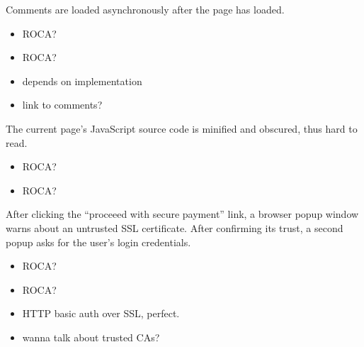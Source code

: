 \documentclass{beamer}
\newcommand{\rocaok}{\ding{51}}
\begin{document}
\begin{frame}
  Comments are loaded asynchronously after the page has loaded.

  \vspace{0.3cm}
  \begin{itemize}
    \item<1|only@1>[\Large $\square$] \Large ROCA?
    \item<2|only@2>[\Large \rocaok] \Large ROCA?
    \item<2> depends on implementation
    \item<2> link to comments?
  \end{itemize}

\end{frame}

\begin{frame}
  The current page's JavaScript source code is minified and obscured, thus hard
  to read.

  \vspace{0.3cm}
  \begin{itemize}
    \item<1|only@1>[\Large $\square$] \Large ROCA?
    \item<2|only@2>[\Large \rocaok] \Large ROCA?
  \end{itemize}

\end{frame}

\begin{frame}
  After clicking the ``proceeed with secure payment'' link, a browser popup window
  warns about an untrusted SSL certificate. After confirming its trust, a second
  popup asks for the user's login credentials.

  \vspace{0.3cm}
  \begin{itemize}
    \item<1|only@1>[\Large $\square$] \Large ROCA?
    \item<2|only@2>[\Large \rocaok] \Large ROCA?
    \item<2> HTTP basic auth over SSL, perfect.
    \item<2> wanna talk about trusted CAs?
  \end{itemize}

\end{frame}
\end{document}
